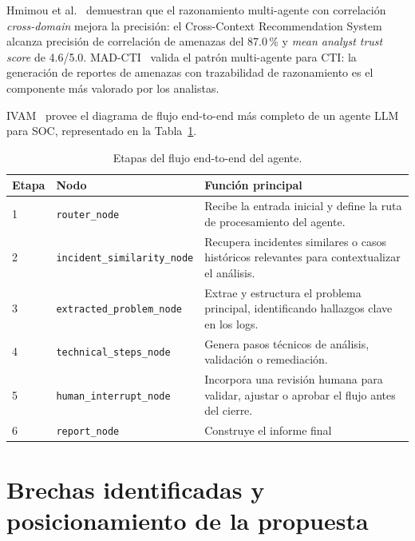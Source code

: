 Hmimou et al.~\cite{hmimou2025multiagent} demuestran que el razonamiento
multi-agente con correlación \textit{cross-domain} mejora la precisión: el
Cross-Context Recommendation System alcanza precisión de correlación de
amenazas del 87.0\,\% y\textit{ mean analyst trust score} de 4.6/5.0. MAD-CTI~\cite{shah2025madcti}
valida el patrón multi-agente para CTI: la generación de reportes de
amenazas con trazabilidad de razonamiento
es el componente más valorado por los analistas.

IVAM~\cite{ismail2025ivam} provee el diagrama de flujo end-to-end más
completo de un agente LLM para SOC, representado en la Tabla~\ref{tab:flujo_end_to_end}. 

\begin{table}[H]
\centering
\caption{Etapas del flujo end-to-end del agente.}
\label{tab:flujo_end_to_end}
\begin{tabular}{p{} p{} p{}}
\hline
\textbf{Etapa} & \textbf{Nodo} & \textbf{Función principal} \\
\hline
1 & \texttt{router\_node} & Recibe la entrada inicial y define la ruta de procesamiento del agente. \\

2 & \texttt{incident\_similarity\_node} & Recupera incidentes similares o casos históricos relevantes para contextualizar el análisis. \\

3 & \texttt{extracted\_problem\_node} & Extrae y estructura el problema principal, identificando hallazgos clave en los logs. \\

4 & \texttt{technical\_steps\_node} & Genera pasos técnicos de análisis, validación o remediación. \\

5 & \texttt{human\_interrupt\_node} & Incorpora una revisión humana para validar, ajustar o aprobar el flujo antes del cierre. \\

6 & \texttt{report\_node} & Construye el informe final
\hline
\end{tabular}
\end{table}


\section{Brechas identificadas y posicionamiento de la propuesta}

